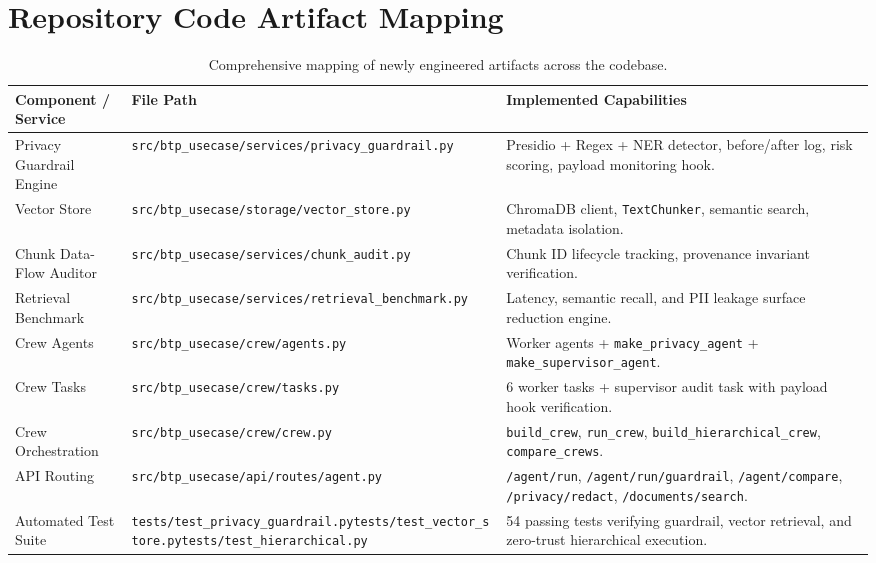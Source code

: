 \documentclass[10pt,a4paper]{article}
\begin{document}
\section{Repository Code Artifact Mapping}

\begin{table}[htbp]
\centering
\small
\begin{tabularx}{\textwidth}{p{3.8cm} p{6.2cm} X}
\toprule
\textbf{Component / Service} & \textbf{File Path} & \textbf{Implemented Capabilities} \\
\midrule
Privacy Guardrail Engine & \texttt{src/btp\_usecase/services/}\newline\texttt{privacy\_guardrail.py} & Presidio + Regex + NER detector, before/after log, risk scoring, payload monitoring hook. \\
\addlinespace
Vector Store & \texttt{src/btp\_usecase/storage/}\newline\texttt{vector\_store.py} & ChromaDB client, \texttt{TextChunker}, semantic search, metadata isolation. \\
\addlinespace
Chunk Data-Flow Auditor & \texttt{src/btp\_usecase/services/}\newline\texttt{chunk\_audit.py} & Chunk ID lifecycle tracking, provenance invariant verification. \\
\addlinespace
Retrieval Benchmark & \texttt{src/btp\_usecase/services/}\newline\texttt{retrieval\_benchmark.py} & Latency, semantic recall, and PII leakage surface reduction engine. \\
\addlinespace
Crew Agents & \texttt{src/btp\_usecase/crew/agents.py} & Worker agents + \texttt{make\_privacy\_agent} + \texttt{make\_supervisor\_agent}. \\
\addlinespace
Crew Tasks & \texttt{src/btp\_usecase/crew/tasks.py} & 6 worker tasks + supervisor audit task with payload hook verification. \\
\addlinespace
Crew Orchestration & \texttt{src/btp\_usecase/crew/crew.py} & \texttt{build\_crew}, \texttt{run\_crew}, \texttt{build\_hierarchical\_crew}, \texttt{compare\_crews}. \\
\addlinespace
API Routing & \texttt{src/btp\_usecase/api/routes/agent.py} & \texttt{/agent/run}, \texttt{/agent/run/guardrail}, \texttt{/agent/compare}, \texttt{/privacy/redact}, \texttt{/documents/search}. \\
\addlinespace
Automated Test Suite & \texttt{tests/test\_privacy\_guardrail.py}\newline \texttt{tests/test\_vector\_store.py}\newline \texttt{tests/test\_hierarchical.py} & 54 passing tests verifying guardrail, vector retrieval, and zero-trust hierarchical execution. \\
\bottomrule
\end{tabularx}
\caption{Comprehensive mapping of newly engineered artifacts across the codebase.}
\label{tab:artifact_mapping}
\end{table}
\end{document}
